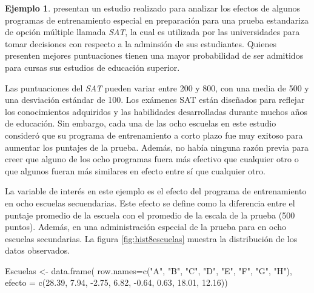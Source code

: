 \documentclass[
  10pt,
  spanish,
]{book}
\newenvironment{Shaded}{\begin{snugshade}}{\end{snugshade}}
\newcommand{\AttributeTok}[1]{\textcolor[rgb]{0.77,0.63,0.00}{#1}}
\newcommand{\FloatTok}[1]{\textcolor[rgb]{0.00,0.00,0.81}{#1}}
\newcommand{\FunctionTok}[1]{\textcolor[rgb]{0.00,0.00,0.00}{#1}}
\newcommand{\NormalTok}[1]{#1}
\newcommand{\OtherTok}[1]{\textcolor[rgb]{0.56,0.35,0.01}{#1}}
\newcommand{\SpecialCharTok}[1]{\textcolor[rgb]{0.00,0.00,0.00}{#1}}
\newcommand{\StringTok}[1]{\textcolor[rgb]{0.31,0.60,0.02}{#1}}
\theoremstyle{definition}
\theoremstyle{definition}
\newtheorem{example}{Ejemplo}[chapter]
\theoremstyle{definition}
\theoremstyle{definition}
\theoremstyle{remark}
\begin{document}
\begin{example}
\protect\hypertarget{exm:8escuelas}{}{\label{exm:8escuelas} }\citet[ , sección 5.5.]{Gelman95} presentan un estudio realizado para analizar los efectos de algunos programas de entrenamiento especial en preparación para una prueba estandariza de opción múltiple llamada \emph{SAT}, la cual es utilizada por las universidades para tomar decisiones con respecto a la adminsión de sus estudiantes. Quienes presenten mejores puntuaciones tienen una mayor probabilidad de ser admitidos para cursas sus estudios de educación superior.

Las puntuaciones del \emph{SAT} pueden variar entre 200 y 800, con una media de 500 y una desviación estándar de 100. Los exámenes SAT están diseñados para reflejar los conocimientos adquiridos y las habilidades desarrolladas durante muchos años de educación. Sin embargo, cada una de las ocho escuelas en este estudio consideró que su programa de entrenamiento a corto plazo fue muy exitoso para aumentar los puntajes de la prueba. Además, no había ninguna razón previa para creer que alguno de los ocho programas fuera más efectivo que cualquier otro o que algunos fueran más similares en efecto entre sí que cualquier otro.

La variable de interés en este ejemplo es el efecto del programa de entrenamiento en ocho escuelas secuendarias. Este efecto se define como la diferencia entre el puntaje promedio de la escuela con el promedio de la escala de la prueba (500 puntos). Además, en una administración especial de la prueba para en ocho escuelas secundarias. La figura \ref{fig:hist8escuelas} muestra la distribución de los datos observados.
\end{example}

\begin{Shaded}
\begin{Highlighting}[]
\NormalTok{Escuelas }\OtherTok{\textless{}{-}} \FunctionTok{data.frame}\NormalTok{(}
  \AttributeTok{row.names=}\FunctionTok{c}\NormalTok{(}\StringTok{"A"}\NormalTok{, }\StringTok{"B"}\NormalTok{, }\StringTok{"C"}\NormalTok{, }\StringTok{"D"}\NormalTok{, }\StringTok{"E"}\NormalTok{, }\StringTok{"F"}\NormalTok{, }\StringTok{"G"}\NormalTok{, }\StringTok{"H"}\NormalTok{),}
  \AttributeTok{efecto =} \FunctionTok{c}\NormalTok{(}\FloatTok{28.39}\NormalTok{, }\FloatTok{7.94}\NormalTok{, }\SpecialCharTok{{-}}\FloatTok{2.75}\NormalTok{, }\FloatTok{6.82}\NormalTok{,}
             \SpecialCharTok{{-}}\FloatTok{0.64}\NormalTok{, }\FloatTok{0.63}\NormalTok{, }\FloatTok{18.01}\NormalTok{, }\FloatTok{12.16}\NormalTok{))}
\end{Highlighting}
\end{Shaded}
\end{document}

